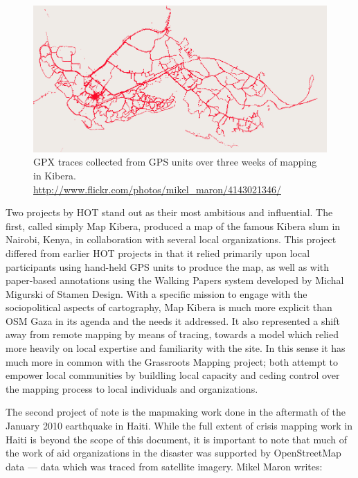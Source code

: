 \documentclass[11pt,oneside,notitlepage]{report}
\begin{document}
\begin{figure}[h]
  \begin{center}
    \includegraphics[width=1\textwidth]{images/kibera-gpx.png}
    \caption{GPX traces collected from GPS units over three weeks of mapping in Kibera. \url{http://www.flickr.com/photos/mikel_maron/4143021346/}}
  \end{center}
\end{figure}

Two projects by \ac{HOT} stand out as their most ambitious and influential. The first, called simply Map Kibera, produced a map of the famous Kibera slum in Nairobi, Kenya, in collaboration with several local organizations. This project differed from earlier \ac{HOT} projects in that it relied primarily upon local participants using hand-held GPS units to produce the map, as well as with paper-based annotations using the Walking Papers system developed by Michal Migurski of Stamen Design. With a specific mission to engage with the sociopolitical aspects of cartography, Map Kibera is much more explicit than OSM Gaza in its agenda and the needs it addressed. It also represented a shift away from remote mapping by means of tracing, towards a model which relied more heavily on local expertise and familiarity with the site. In this sense it has much more in common with the Grassroots Mapping project; both attempt to empower local communities by buildling local capacity and ceding control over the mapping process to local individuals and organizations. 

The second project of note is the mapmaking work done in the aftermath of the January 2010 earthquake in Haiti. While the full extent of crisis mapping work in Haiti is beyond the scope of this document, it is important to note that much of the work of aid organizations in the disaster was supported by OpenStreetMap data --- data which was traced from satellite imagery. Mikel Maron writes: 
\end{document}
